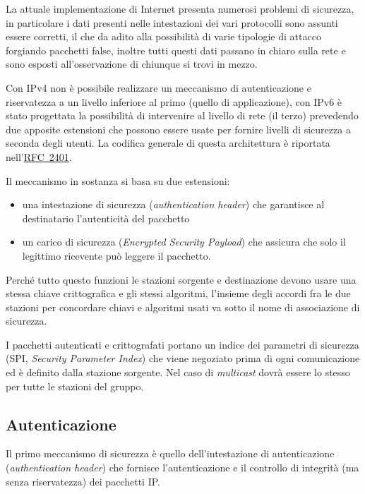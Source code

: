 La attuale implementazione di Internet presenta numerosi problemi di
sicurezza, in particolare i dati presenti nelle intestazioni dei vari
protocolli sono assunti essere corretti, il che da adito alla possibilità di
varie tipologie di attacco forgiando pacchetti false, inoltre tutti questi
dati passano in chiaro sulla rete e sono esposti all'osservazione di chiunque
si trovi in mezzo.

Con IPv4 non è possibile realizzare un meccanismo di autenticazione e
riservatezza a un livello inferiore al primo (quello di applicazione), con
IPv6 è stato progettata la possibilità di intervenire al livello di rete (il
terzo) prevedendo due apposite estensioni che possono essere usate per fornire
livelli di sicurezza a seconda degli utenti. La codifica generale di questa
architettura è riportata
nell'\href{http://www.ietf.org/rfc/rfc2401.txt}{RFC~2401}.

Il meccanismo in sostanza si basa su due estensioni:
\begin{itemize}
\item una intestazione di sicurezza (\textit{authentication header}) che
  garantisce al destinatario l'autenticità del pacchetto
\item un carico di sicurezza (\textit{Encrypted Security Payload}) che
  assicura che solo il legittimo ricevente può leggere il pacchetto.
\end{itemize}

Perché tutto questo funzioni le stazioni sorgente e destinazione devono
usare una stessa chiave crittografica e gli stessi algoritmi, l'insieme degli
accordi fra le due stazioni per concordare chiavi e algoritmi usati va sotto
il nome di associazione di sicurezza.

I pacchetti autenticati e crittografati portano un indice dei parametri di
sicurezza (SPI, \textit{Security Parameter Index}) che viene negoziato prima
di ogni comunicazione ed è definito dalla stazione sorgente. Nel caso di
\textit{multicast} dovrà essere lo stesso per tutte le stazioni del gruppo.

\subsection{Autenticazione}
\label{sec:auth} 

Il primo meccanismo di sicurezza è quello dell'intestazione di autenticazione
(\textit{authentication header}) che fornisce l'autenticazione e il controllo
di integrità (ma senza riservatezza) dei pacchetti IP.


